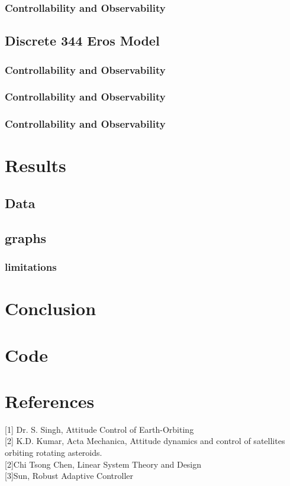 \documentclass{article}
\begin{document}
\subsubsection{Controllability and Observability}

\subsection{Discrete 344 Eros Model}
\subsubsection{Controllability and Observability}

\subsubsection{Controllability and Observability}


\subsubsection{Controllability and Observability}

\section{Results}

\subsection{Data}
\subsection{graphs}
\subsubsection{limitations}

\section{Conclusion}
\section{Code}


\section{References}
[1] Dr. S. Singh, Attitude Control of Earth-Orbiting  \\

[2] K.D. Kumar, Acta Mechanica, Attitude dynamics and control of satellites orbiting rotating asteroids. \\

[2]Chi Tsong Chen, Linear System Theory and Design \\

[3]Sun, Robust Adaptive Controller\\
\end{document}
